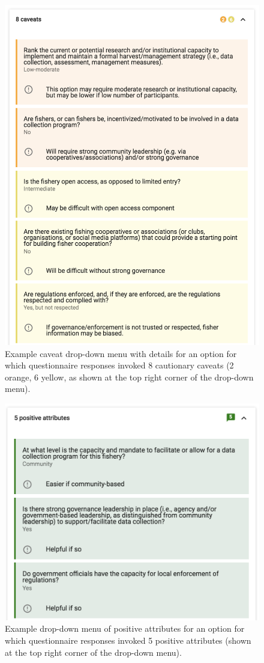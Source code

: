 \documentclass[11pt,]{book}
\begin{document}
\begin{figure}

{\centering \includegraphics[width=0.75\linewidth]{images/cav-drop-down} 

}

\caption{Example caveat drop-down menu with details for an option for which questionnaire responses invoked 8 cautionary caveats (2 orange, 6 yellow, as shown at the top right corner of the drop-down menu).}\label{fig:cav-drop-down}
\end{figure}

\begin{figure}

{\centering \includegraphics[width=0.75\linewidth]{images/pos-attr-drop-down} 

}

\caption{Example drop-down menu of positive attributes for an option for which questionnaire responses invoked 5 positive attributes (shown at the top right corner of the drop-down menu).}\label{fig:pos-attr-drop-down}
\end{figure}
\end{document}
